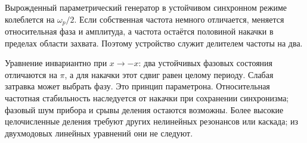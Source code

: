 Вырожденный параметрический генератор в устойчивом синхронном режиме колеблется на $\omega_p/2$. Если собственная частота немного отличается, меняется относительная фаза и амплитуда, а частота остаётся половиной накачки в пределах области захвата. Поэтому устройство служит делителем частоты на два.

Уравнение инвариантно при $x\to-x$: два устойчивых фазовых состояния отличаются на $\pi$, а для накачки этот сдвиг равен целому периоду. Слабая затравка может выбрать фазу. Это принцип параметрона. Относительная частотная стабильность наследуется от накачки при сохранении синхронизма; фазовый шум прибора и срывы деления остаются возможны. Более высокие целочисленные деления требуют других нелинейных резонансов или каскада; из двухмодовых линейных уравнений они не следуют.
